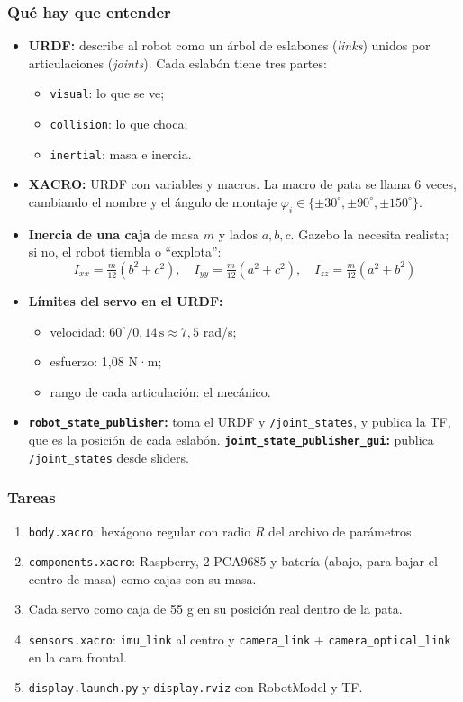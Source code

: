 \documentclass[11pt,a4paper]{article}
\begin{document}
\subsubsection{Qué hay que entender}
\begin{itemize}
  \item \textbf{URDF:} describe al robot como un árbol de eslabones (\emph{links}) unidos por articulaciones (\emph{joints}). Cada eslabón tiene tres partes:
  \begin{itemize}
    \item \texttt{visual}: lo que se ve;
    \item \texttt{collision}: lo que choca;
    \item \texttt{inertial}: masa e inercia.
  \end{itemize}
  \item \textbf{XACRO:} URDF con variables y macros. La macro de pata se llama 6 veces, cambiando el nombre y el ángulo de montaje $\varphi_i \in \{\pm30^\circ, \pm90^\circ, \pm150^\circ\}$.
  \item \textbf{Inercia de una caja} de masa $m$ y lados $a, b, c$. Gazebo la necesita realista; si no, el robot tiembla o “explota”:
  \begin{equation}
  I_{xx} = \tfrac{m}{12}(b^2+c^2),\quad I_{yy} = \tfrac{m}{12}(a^2+c^2),\quad I_{zz} = \tfrac{m}{12}(a^2+b^2)
  \end{equation}
  \item \textbf{Límites del servo en el URDF:}
  \begin{itemize}
    \item velocidad: $60^\circ / 0{,}14\,\text{s} \approx 7{,}5$ rad/s;
    \item esfuerzo: 1,08 N·m;
    \item rango de cada articulación: el mecánico.
  \end{itemize}
  \item \textbf{\texttt{robot\_state\_publisher}:} toma el URDF y \texttt{/joint\_states}, y publica la TF, que es la posición de cada eslabón. \textbf{\texttt{joint\_state\_publisher\_gui}:} publica \texttt{/joint\_states} desde sliders.
\end{itemize}

\subsubsection{Tareas}
\begin{enumerate}[label=T\arabic*]
  \item \texttt{body.xacro}: hexágono regular con radio $R$ del archivo de parámetros.
  \item \texttt{components.xacro}: Raspberry, 2 PCA9685 y batería (abajo, para bajar el centro de masa) como cajas con su masa.
  \item Cada servo como caja de 55 g en su posición real dentro de la pata.
  \item \texttt{sensors.xacro}: \texttt{imu\_link} al centro y \texttt{camera\_link} + \texttt{camera\_optical\_link} en la cara frontal.
  \item \texttt{display.launch.py} y \texttt{display.rviz} con RobotModel y TF.
\end{enumerate}
\end{document}
